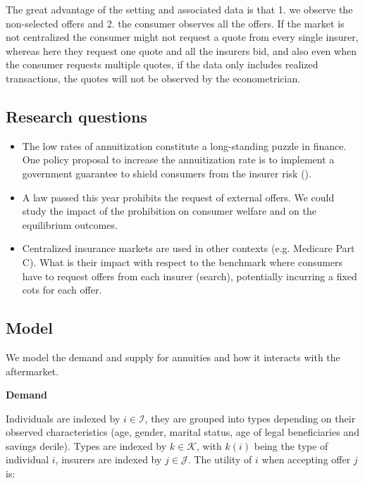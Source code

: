 \documentclass[12pt]{article}
\theoremstyle{plain}
\theoremstyle{plain}
\begin{document}
The great advantage of the setting and associated data is that 1. we observe the non-selected offers and 2. the consumer observes all the offers. If the market is not centralized the consumer might not request a quote from every single insurer, whereas here they request one quote and all the insurers bid, and also even when the consumer requests multiple quotes, if the data only includes realized transactions, the quotes will not be observed by the econometrician. 

 


\subsection*{Research questions}

\begin{itemize}
    \item The low rates of annuitization constitute a long-standing puzzle in finance. One policy proposal to increase the annuitization rate is to implement a government guarantee to shield consumers from the insurer risk (\cite{benartzi_annuitization_2011}). 
    
    \item A law passed this year prohibits the request of external offers. We could study the impact of the prohibition on consumer welfare and on the equilibrium outcomes. 

    \item Centralized insurance markets are used in other contexts (e.g. Medicare Part C). What is their impact with respect to the benchmark where consumers have to request offers from each insurer (search), potentially incurring a fixed cots for each offer. 

\end{itemize}

\subsection*{Model}
We model the demand and supply for annuities and how it interacts with the aftermarket. 

\textbf{Demand}
 
Individuals are indexed by $i\in \mathcal{I}$, they are grouped into types depending on their observed characteristics (age, gender, marital status, age of legal beneficiaries and savings decile). Types are indexed by $k \in \mathcal{K}$, with $k(i)$ being the type of individual $i$, insurers are indexed by $j\in \mathcal{J}$.  The utility of $i$ when accepting offer $j$ is: 
\end{document}
